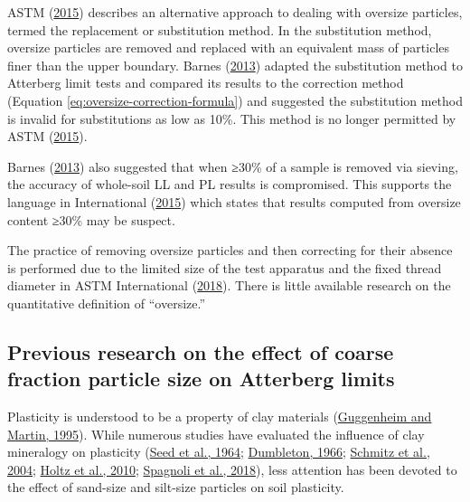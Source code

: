 \documentclass[
  letterpaper,
]{article}
\begin{document}
ASTM (\protect\hyperlink{ref-ASTMD15572015}{2015}) describes an alternative approach to dealing with oversize particles, termed the replacement or substitution method.
In the substitution method, oversize particles are removed and replaced with an equivalent mass of particles finer than the upper boundary.
Barnes (\protect\hyperlink{ref-Barnes2013}{2013}) adapted the substitution method to Atterberg limit tests and compared its results to the correction method (Equation \eqref{eq:oversize-correction-formula}) and suggested the substitution method is invalid for substitutions as low as 10\%.
This method is no longer permitted by ASTM (\protect\hyperlink{ref-ASTMD15572015}{2015}).

Barnes (\protect\hyperlink{ref-Barnes2013}{2013}) also suggested that when ≥30\% of a sample is removed via sieving, the accuracy of whole-soil LL and PL results is compromised.
This supports the language in International (\protect\hyperlink{ref-ASTMInternational2015a}{2015}) which states that results computed from oversize content ≥30\% may be suspect.

The practice of removing oversize particles and then correcting for their absence is performed due to the limited size of the test apparatus and the fixed thread diameter in ASTM International (\protect\hyperlink{ref-ASTMD43182018}{2018}).
There is little available research on the quantitative definition of ``oversize.''

\hypertarget{previous-research-on-the-effect-of-coarse-fraction-particle-size-on-atterberg-limits}{%
\subsection{Previous research on the effect of coarse fraction particle size on Atterberg limits}\label{previous-research-on-the-effect-of-coarse-fraction-particle-size-on-atterberg-limits}}

Plasticity is understood to be a property of clay materials (\protect\hyperlink{ref-Guggenheim1995}{Guggenheim and Martin, 1995}).
While numerous studies have evaluated the influence of clay mineralogy on plasticity (\protect\hyperlink{ref-Seed1964a}{Seed et al., 1964}; \protect\hyperlink{ref-Dumbleton1966a}{Dumbleton, 1966}; \protect\hyperlink{ref-Schmitz2004a}{Schmitz et al., 2004}; \protect\hyperlink{ref-Holtz2010}{Holtz et al., 2010}; \protect\hyperlink{ref-Spagnoli2018}{Spagnoli et al., 2018}),
less attention has been devoted to the effect of sand-size and silt-size particles on soil plasticity.
\end{document}
